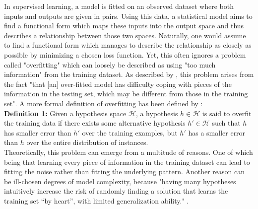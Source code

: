 \documentclass[12pt,a4paper]{article}
\begin{document}
In supervised learning, a model is fitted on an observed dataset where both inputs and outputs are given in pairs. Using this data, a statistical model aims to find a functional form which maps these inputs into the output space and thus describes a relationship between those two spaces. Naturally, one would assume to find a functional form which manages to describe the relationship as closely as possible by minimizing a chosen loss function. Yet, this often ignores a problem called "overfitting" which can loosely be described as using "too much information" from the training dataset. As described by \textcite{Ying2019}, this problem arises from the fact "that [an] over-fitted model has difficulty coping with pieces of the information in the testing set, which may be different from those in the training set". A more formal definition of overfitting has been defined by \textcite{Mitchell1997}:\\

\textbf{Definition 1:} Given a hypothesis space $\mathcal{H}$, a hypothesis $h \in \mathcal{H}$ is said to overfit the training data if there exists some alternative hypothesis $h' \in \mathcal{H}$ such that $h$ has smaller error than $h'$ over the training examples, but $h'$ has a smaller error than $h$ over the entire distribution of instances.\\

Theoretically, this problem can emerge from a multitude of reasons. One of which being that learning every piece of information in the training dataset can lead to fitting the noise rather than fitting the underlying pattern. Another reason can be ill-chosen degrees of model complexity, because "having many hypotheses intuitively increase the risk of randomly finding a solution that learns the training set “by heart”, with limited generalization ability." \parencite{ParisRobilliardFonlupt2003}.\\  
\end{document}
